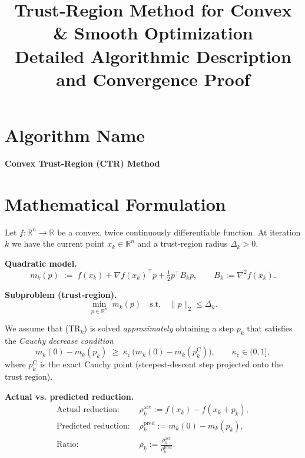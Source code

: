 \documentclass{article}
\begin{document}
\title{Trust‑Region Method for Convex \& Smooth Optimization \\ Detailed Algorithmic Description and Convergence Proof}
\author{}
\date{}
\maketitle

\section*{Algorithm Name}
\textbf{Convex Trust‑Region (CTR) Method}

\section*{Mathematical Formulation}
Let $f:\mathbb{R}^{n}\rightarrow\mathbb{R}$ be a convex, twice continuously differentiable function.
At iteration $k$ we have the current point $x_{k}\in\mathbb{R}^{n}$ and a trust‑region radius
$\Delta_{k}>0$.

\medskip
\noindent\textbf{Quadratic model.}
\[
m_{k}(p)\;:=\;f(x_{k})+\nabla f(x_{k})^{\top}p+\tfrac12 p^{\top}B_{k}p,
\qquad B_{k}:=\nabla^{2}f(x_{k}) .
\]

\noindent\textbf{Subproblem (trust‑region).}
\[
\min_{p\in\mathbb{R}^{n}}\; m_{k}(p)\quad\text{s.t.}\quad \|p\|_{2}\le \Delta_{k}.
\tag{TR$_k$}
\]

We assume that (TR$_k$) is solved \emph{approximately} obtaining a step $p_{k}$ that satisfies
the \emph{Cauchy decrease condition}
\[
m_{k}(0)-m_{k}(p_{k})\;\ge\;\kappa_{\mathrm{c}}\,
\bigl(m_{k}(0)-m_{k}(p^{\mathrm{C}}_{k})\bigr),\qquad
\kappa_{\mathrm{c}}\in(0,1],
\tag{1}
\]
where $p^{\mathrm{C}}_{k}$ is the exact Cauchy point (steepest‑descent step projected onto the
trust region).

\medskip
\noindent\textbf{Actual vs. predicted reduction.}
\[
\begin{aligned}
\text{Actual reduction: }&\rho^{\mathrm{act}}_{k}
:= f(x_{k})-f(x_{k}+p_{k}),\\[2mm]
\text{Predicted reduction: }&\rho^{\mathrm{pred}}_{k}
:= m_{k}(0)-m_{k}(p_{k}),\\[2mm]
\text{Ratio: }&\rho_{k}:=
\frac{\rho^{\mathrm{act}}_{k}}{\rho^{\mathrm{pred}}_{k}} .
\end{aligned}
\tag{2}
\]
\end{document}

